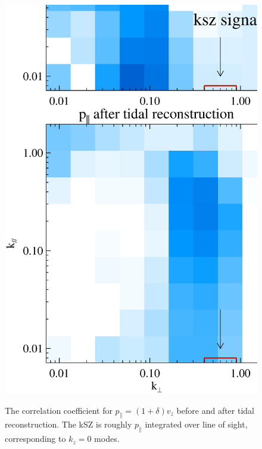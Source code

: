 \begin{figure}[btp]
\begin{minipage}[t]{0.33\linewidth}
\label{fig:v}
\end{minipage}
\begin{minipage}[t]{0.33\linewidth}
\begin{center}
\includegraphics[width=\textwidth,height=1.7\textwidth]{figure/powmomen_before_after_tide.eps}
\end{center}
\vspace{-0.7cm}
\label{fig:p}
\caption{The correlation coefficient for $p_\parallel=(1+\delta)v_z$ before and 
after tidal reconstruction. 
The kSZ is roughly $p_\parallel$ integrated over line of sight, 
corresponding to $k_z=0$ modes.}
\end{minipage}
\end{figure}

